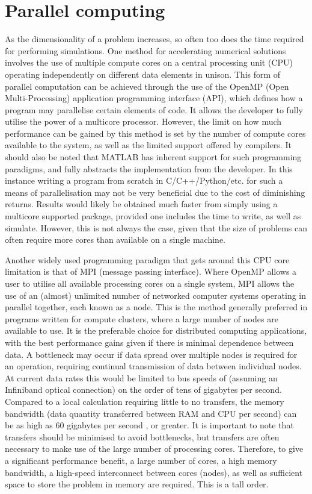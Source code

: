 \section{Parallel computing}

As the dimensionality of a problem increases, so often too does the time required for performing simulations. One method for accelerating numerical solutions involves the use of multiple compute cores on a central processing unit (CPU) operating independently on different data elements in unison. This form of parallel computation can be achieved through the use of the OpenMP (Open Multi-Processing) application programming interface (API), which defines how a program may parallelise certain elements of code. It allows the developer to fully utilise the power of a multicore processor. However, the limit on how much performance can be gained by this method is set by the number of compute cores available to the system, as well as the limited support offered by compilers. It should also be noted that \textsc{MATLAB} has inherent support for such programming paradigms, and fully abstracts the implementation from the developer. In this instance writing a program from scratch in C/C++/Python/etc. for such a means of parallelisation may not be very beneficial due to the cost of diminishing returns. Results would likely be obtained much faster from simply using a multicore supported package, provided one includes the time to write, as well as simulate. However, this is not always the case, given that the size of problems can often require more cores than available on a single machine.

Another widely used programming paradigm that gets around this CPU core limitation is that of MPI (message passing interface). Where OpenMP allows a user to utilise all available processing cores on a single system, MPI allows the use of an (almost) unlimited number of networked computer systems operating in parallel together, each known as a node. This is the method generally preferred in programs written for compute clusters, where a large number of nodes are available to use. It is the preferable choice for distributed computing applications, with the best performance gains given if there is minimal dependence between data. A bottleneck may occur if data spread over multiple nodes is required for an operation, requiring continual transmission of data between individual nodes. At current data rates this would be limited to bus speeds of (assuming an Infiniband optical connection) on the order of tens of gigabytes per second. Compared to a local calculation requiring little to no transfers, the memory bandwidth (data quantity transferred between RAM and CPU per second) can be as high as 60 gigabytes per second \cite{DAT:Intel_xeon}, or greater. It is important to note that transfers should be minimised to avoid bottlenecks, but transfers are often necessary to make use of the large number of processing cores. Therefore, to give a significant performance benefit, a large number of cores, a high memory bandwidth, a high-speed interconnect between cores (nodes), as well as sufficient space to store the problem in memory are required. This is a tall order.

